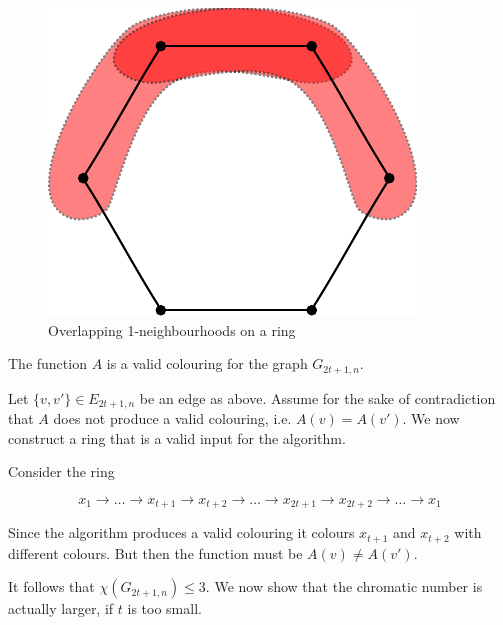 \begin{figure}[hbt]
\begin{center}
\includegraphics{./images/ring.pdf}
\end{center}
\caption{Overlapping 1-neighbourhoods on a ring}
\end{figure}

\begin{lem} The function $A$ is a valid colouring for the graph $G_{2t+1,n}$.\end{lem}

\begin{pr} Let $\{v,v'\}\in E_{2t+1,n}$ be an edge as above. Assume for the sake of contradiction that $A$ does not produce a valid colouring, i.e. $A(v)=A(v')$. We now construct a ring that is a valid input for the algorithm.

Consider the ring 

\[x_1\rightarrow \ldots \rightarrow x_{t+1} \rightarrow x_{t+2} \rightarrow \ldots \rightarrow x_{2t+1} \rightarrow x_{2t+2} \rightarrow \ldots \rightarrow x_1\] 


Since the algorithm produces a valid colouring it colours $x_{t+1}$ and $x_{t+2}$ with different colours. But then the function must be $A(v)\neq A(v')$.
\end{pr}

It follows that $\chi(G_{2t+1,n})\leq 3$. We now show that the chromatic number is actually larger, if $t$ is too small.

